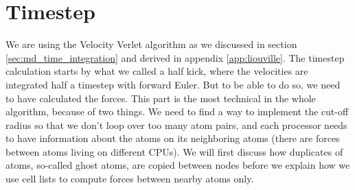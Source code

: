 \section{Timestep}
\label{sec:md_timestep}
We are using the Velocity Verlet algorithm as we discussed in section \ref{sec:md_time_integration} and derived in appendix \ref{app:liouville}. The timestep calculation starts by what we called a half kick, where the velocities are integrated half a timestep with forward Euler. But to be able to do so, we need to have calculated the forces. This part is the most technical in the whole algorithm, because of two things. We need to find a way to implement the cut-off radius so that we don't loop over too many atom pairs, and each processor needs to have information about the atoms on its neighboring atoms (there are forces between atoms living on different CPUs). We will first discuss how duplicates of atoms, so-called ghost atoms, are copied between nodes before we explain how we use cell lists to compute forces between nearby atoms only. 
